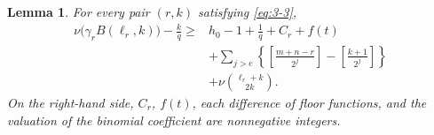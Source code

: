 \documentclass[11pt,a4paper]{article}
\numberwithin{equation}{section}
\newtheorem{lemma}[theorem]{Lemma}
\theoremstyle{definition}
\begin{document}
\begin{lemma}\label{lem:3-3}
For every pair $(r,k)$ satisfying \eqref{eq:3-3},
\begin{equation}
\begin{aligned}
\nu\bigl(\gamma_rB(\ell_r,k)\bigr)-\frac{k}{q}
\ge{}&h_0-1+\frac1q+C_r+f(t)\\
&+\sum_{j>e}\left\{
\left[\frac{m+n-r}{2^j}\right]-\left[\frac{k+1}{2^j}\right]
\right\}\\
&+\nu\binom{\ell_r+k}{2k}.
\end{aligned}
\label{eq:3-8}
\end{equation}
On the right-hand side, $C_r$, $f(t)$, each difference of floor functions, and the valuation of the binomial coefficient are nonnegative integers.
\end{lemma}
\end{document}
